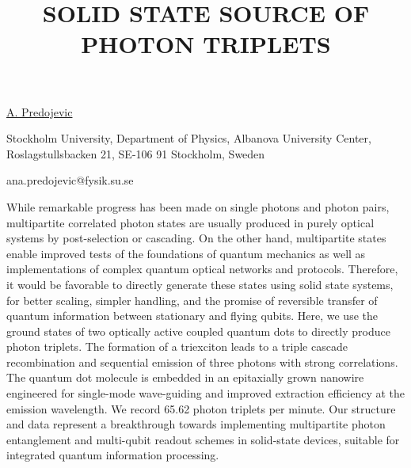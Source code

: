 \title{SOLID STATE SOURCE OF PHOTON TRIPLETS}

\underline{A. Predojevic} 

{\normalsize{\vspace{-4mm}
Stockholm University,
Department of Physics,
Albanova University Center,
Roslagstullsbacken 21,
SE-106 91 Stockholm,
Sweden



\email ana.predojevic@fysik.su.se}}

While remarkable progress has been made on single photons and photon pairs, multipartite correlated photon states are usually produced in purely optical systems by post-selection or cascading. On the other hand, multipartite states enable improved tests of the foundations of quantum mechanics as well as implementations of complex quantum optical networks and protocols. Therefore, it would be favorable to directly generate these states using solid state systems, for better scaling, simpler handling, and the promise of reversible transfer of quantum information between stationary and flying qubits.
Here, we use the ground states of two optically active coupled quantum dots to directly produce photon triplets. The formation of a triexciton leads to a triple cascade recombination and sequential emission of three photons with strong correlations. The quantum dot molecule is embedded in an epitaxially grown nanowire engineered for single-mode wave-guiding and improved extraction efficiency at the emission wavelength. We record 65.62 photon triplets per minute. Our structure and data represent a breakthrough towards implementing multipartite photon entanglement and multi-qubit readout schemes in solid-state devices, suitable for integrated quantum information processing.


\vspace{\baselineskip}
